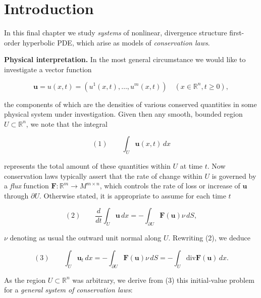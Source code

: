 
\section{Introduction}\label{sec:conservation-laws-introduction}

In this final chapter we study \textit{systems} of nonlinear, divergence structure first-order hyperbolic PDE, which arise as models of \textit{conservation laws}.

\textbf{Physical interpretation.} In the most general circumstance we would like to investigate a vector function

$$\mathbf{u} = u(x,t) = (u^1(x,t), \ldots, u^m(x,t)) \quad (x \in \mathbb{R}^n, t \geq 0),$$

the components of which are the densities of various conserved quantities in some physical system under investigation. Given then any smooth, bounded region $U \subset \mathbb{R}^n$, we note that the integral

$$(1) \qquad \int_U \mathbf{u}(x,t) \, dx$$

represents the total amount of these quantities within $U$ at time $t$. Now conservation laws typically assert that the rate of change within $U$ is governed by a \textit{flux} function $\mathbf{F}: \mathbb{R}^m \to M^{m \times n}$, which controls the rate of loss or increase of $\mathbf{u}$ through $\partial U$. Otherwise stated, it is appropriate to assume for each time $t$

$$(2) \qquad \frac{d}{dt} \int_U \mathbf{u} \, dx = - \int_{\partial U} \mathbf{F}(\mathbf{u})\nu \, dS,$$

$\nu$ denoting as usual the outward unit normal along $U$. Rewriting (2), we deduce

$$(3) \qquad \int_U \mathbf{u}_t \, dx = - \int_{\partial U} \mathbf{F}(\mathbf{u})\nu \, dS = - \int_U \text{div} \mathbf{F}(\mathbf{u}) \, dx.$$

As the region $U \subset \mathbb{R}^n$ was arbitrary, we derive from (3) this initial-value problem for a \textit{general system of conservation laws}:

